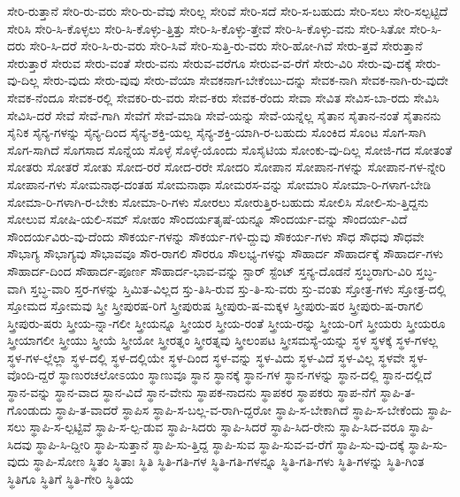 {ಸೇರಿ-ರುತ್ತಾನೆ
ಸೇರಿ-ರು-ವರು
ಸೇರಿ-ರು-ವೆವು
ಸೇರಿಲ್ಲ
ಸೇರಿವೆ
ಸೇರಿ-ಸದೆ
ಸೇರಿ-ಸ-ಬಹುದು
ಸೇರಿ-ಸಲು
ಸೇರಿ-ಸಲ್ಪಟ್ಟಿದೆ
ಸೇರಿಸಿ
ಸೇರಿ-ಸಿ-ಕೊಳ್ಳಲು
ಸೇರಿ-ಸಿ-ಕೊಳ್ಳು-ತ್ತಿತ್ತು
ಸೇರಿ-ಸಿ-ಕೊಳ್ಳು-ತ್ತೇವೆ
ಸೇರಿ-ಸಿ-ಕೊಳ್ಳು-ವನು
ಸೇರಿ-ಸಿತೋ
ಸೇರಿ-ಸಿ-ದರು
ಸೇರಿ-ಸಿ-ದರೆ
ಸೇರಿ-ಸಿ-ರು-ವರು
ಸೇರಿ-ಸಿವೆ
ಸೇರಿ-ಸುತ್ತಿ-ರು-ವರು
ಸೇರಿ-ಹೋ-ಗಿವೆ
ಸೇರು-ತ್ತವೆ
ಸೇರುತ್ತಾನೆ
ಸೇರುತ್ತಾರೆ
ಸೇರುವ
ಸೇರು-ವಂತೆ
ಸೇರು-ವನು
ಸೇರುವ-ವರೆಗೂ
ಸೇರುವ-ವ-ರೆಗೆ
ಸೇರು-ವಿರಿ
ಸೇರು-ವು-ದಕ್ಕೆ
ಸೇರು-ವು-ದಿಲ್ಲ
ಸೇರು-ವುದು
ಸೇರು-ವುವು
ಸೇರು-ವೆಯಾ
ಸೇವಕನಾಗ-ಬೇಕೆಂಬು-ದನ್ನು
ಸೇವಕ-ನಾಗಿ
ಸೇವಕ-ನಾಗಿ-ರು-ವುದೇ
ಸೇವಕ-ನೆಂದೂ
ಸೇವಕ-ರಲ್ಲಿ
ಸೇವಕರಿ-ರು-ವರು
ಸೇವ-ಕರು
ಸೇವಕ-ರೆಂದು
ಸೇವಾ
ಸೇವಿತ
ಸೇವಿಸ-ಬಾ-ರದು
ಸೇವಿಸಿ
ಸೇವಿಸಿ-ದರೆ
ಸೇವೆ
ಸೇವೆ-ಗಾಗಿ
ಸೇವೆಗೆ
ಸೇವೆ-ಮಾಡಿ
ಸೇವೆ-ಯನ್ನು
ಸೇವೆ-ಯನ್ನೆಲ್ಲ
ಸೈತಾನ
ಸೈತಾನ-ನಂತೆ
ಸೈತಾನನು
ಸೈನಿಕ
ಸೈನ್ಯ-ಗಳನ್ನು
ಸೈನ್ಯ-ದಿಂದ
ಸೈನ್ಯ-ಶಕ್ತಿ-ಯಲ್ಲ
ಸೈನ್ಯ-ಶಕ್ತಿ-ಯಾಗಿ-ರ-ಬಹುದು
ಸೊಂಕಿದ
ಸೊಂಟ
ಸೊಗ-ಸಾಗಿ
ಸೊಗ-ಸಾಗಿದೆ
ಸೊಗಸಾದ
ಸೊನ್ನೆಯ
ಸೊಳ್ಳೆ
ಸೊಳ್ಳೆ-ಯೊಂದು
ಸೊಸೈಟಿಯ
ಸೋಂಕು-ವು-ದಿಲ್ಲ
ಸೋಜಿ-ಗದ
ಸೋತಂತೆ
ಸೋತರು
ಸೋತರೆ
ಸೋತು
ಸೋದ-ರರೆ
ಸೋದ-ರರೇ
ಸೋದರಿ
ಸೋಪಾನ
ಸೋಪಾನ-ಗಳನ್ನು
ಸೋಪಾನ-ಗಳ-ನ್ನೇರಿ
ಸೋಪಾನ-ಗಳು
ಸೋಮನಾಥ-ದಂತಹ
ಸೋಮನಾಥಾ
ಸೋಮರಸ-ವನ್ನು
ಸೋಮಾರಿ
ಸೋಮಾ-ರಿ-ಗಳಾಗ-ಬೇಡಿ
ಸೋಮಾ-ರಿ-ಗಳಾಗಿ-ರ-ಬೇಕು
ಸೋಮಾ-ರಿ-ಗಳು
ಸೋರಲು
ಸೋರುತ್ತಿರ-ಬಹುದು
ಸೋಲಿಸಿ
ಸೋಲಿ-ಸು-ತ್ತಿದ್ದನು
ಸೋಲುವ
ಸೋಷಿ-ಯಲಿ-ಸಮ್
ಸೋಹಂ
ಸೌಂದರ್ಯತೃಷೆ-ಯನ್ನೂ
ಸೌಂದರ್ಯ-ವನ್ನು
ಸೌಂದರ್ಯ-ವಿದೆ
ಸೌಂದರ್ಯವಿರು-ವು-ದೆಂದು
ಸೌಕರ್ಯ-ಗಳನ್ನು
ಸೌಕರ್ಯ-ಗಳಿ-ದ್ದುವು
ಸೌಕರ್ಯ-ಗಳು
ಸೌಧ
ಸೌಧವು
ಸೌಧವೇ
ಸೌಭಾಗ್ಯ
ಸೌಭಾಗ್ಯವು
ಸೌಭಾವವೂ
ಸೌರ-ರಾಗಲಿ
ಸೌರರೂ
ಸೌಲಭ್ಯ-ಗಳನ್ನು
ಸೌಹಾರ್ದ
ಸೌಹಾರ್ದಕ್ಕೆ
ಸೌಹಾರ್ದ-ಗಳು
ಸೌಹಾರ್ದ-ದಿಂದ
ಸೌಹಾರ್ದ-ಪೂರ್ಣ
ಸೌಹಾರ್ದ-ಭಾವ-ವನ್ನು
ಸ್ಟಾರ್
ಸ್ಟೆಂಟ್
ಸ್ತನ್ಯ-ದೊಡನೆ
ಸ್ತಬ್ಧರಾಗು-ವಿರಿ
ಸ್ತಬ್ಧ-ವಾಗಿ
ಸ್ತಬ್ಧ-ವಾರಿ
ಸ್ತರ-ಗಳನ್ನು
ಸ್ತಿಮಿತ-ವಿಲ್ಲದ
ಸ್ತು-ತಿಸಿ-ರುವ
ಸ್ತು-ತಿ-ಸು-ವರು
ಸ್ತು-ವಂತು
ಸ್ತೋತ್ರ-ಗಳು
ಸ್ತೋತ್ರ-ದಲ್ಲಿ
ಸ್ತೋಮದ
ಸ್ತೋಮವು
ಸ್ತ್ರೀ
ಸ್ತ್ರೀಪುರಷ-ರಿಗೆ
ಸ್ತ್ರೀಪುರುಷ
ಸ್ತ್ರೀಪುರು-ಷ-ಮಕ್ಕಳ
ಸ್ತ್ರೀಪುರು-ಷರ
ಸ್ತ್ರೀಪುರು-ಷ-ರಾಗಲಿ
ಸ್ತ್ರೀಪುರು-ಷರು
ಸ್ತ್ರೀಯ-ನ್ನಾ-ಗಲೀ
ಸ್ತ್ರೀಯನ್ನೂ
ಸ್ತ್ರೀಯರ
ಸ್ತ್ರೀಯ-ರಂತೆ
ಸ್ತ್ರೀಯ-ರನ್ನು
ಸ್ತ್ರೀಯ-ರಿಗೆ
ಸ್ತ್ರೀಯರು
ಸ್ತ್ರೀಯರೂ
ಸ್ತ್ರೀಯಾಗಲೀ
ಸ್ತ್ರೀಯು
ಸ್ತ್ರೀಯೆ
ಸ್ತ್ರೀಯೋ
ಸ್ತ್ರೀರತ್ನಂ
ಸ್ತ್ರೀರತ್ನವು
ಸ್ತ್ರೀಲಂಪಟ
ಸ್ತ್ರೀಸಮಸ್ಯೆ-ಯನ್ನು
ಸ್ಥಳ
ಸ್ಥಳಕ್ಕೆ
ಸ್ಥಳ-ಗಳಲ್ಲ
ಸ್ಥಳ-ಗಳ-ಲ್ಲೆಲ್ಲಾ
ಸ್ಥಳ-ದಲ್ಲಿ
ಸ್ಥಳ-ದಲ್ಲಿಯೇ
ಸ್ಥಳ-ದಿಂದ
ಸ್ಥಳ-ವನ್ನು
ಸ್ಥಳ-ವಿದು
ಸ್ಥಳ-ವಿದೆ
ಸ್ಥಳ-ವಿಲ್ಲ
ಸ್ಥಳವೇ
ಸ್ಥಳ-ವೊಂದಿ-ದ್ದರೆ
ಸ್ಥಾಣುರಚಲೋಽಯಂ
ಸ್ಥಾಣುವೂ
ಸ್ಥಾನ
ಸ್ಥಾನಕ್ಕೆ
ಸ್ಥಾನ-ಗಳ
ಸ್ಥಾನ-ಗಳನ್ನು
ಸ್ಥಾನ-ದಲ್ಲಿ
ಸ್ಥಾನ-ದಲ್ಲಿದೆ
ಸ್ಥಾನ-ವನ್ನು
ಸ್ಥಾನ-ವಾದ
ಸ್ಥಾನ-ವಿದೆ
ಸ್ಥಾನ-ವೇನು
ಸ್ಥಾಪಕ-ನಾದನು
ಸ್ಥಾಪಕರ
ಸ್ಥಾಪಕರು
ಸ್ಥಾಪ-ನೆಗೆ
ಸ್ಥಾಪಿ-ತ-ಗೊಂಡುದು
ಸ್ಥಾಪಿ-ತ-ವಾದರೆ
ಸ್ಥಾಪಿಸ
ಸ್ಥಾಪಿ-ಸ-ಬಲ್ಲ-ವ-ರಾಗಿ-ದ್ದರೋ
ಸ್ಥಾಪಿ-ಸ-ಬೇಕಾಗಿದೆ
ಸ್ಥಾಪಿ-ಸ-ಬೇಕೆಂದು
ಸ್ಥಾಪಿ-ಸಲು
ಸ್ಥಾಪಿ-ಸ-ಲ್ಪಟ್ಟಿವೆ
ಸ್ಥಾಪಿ-ಸ-ಲ್ಪ-ಡುವ
ಸ್ಥಾಪಿ-ಸಿದರು
ಸ್ಥಾಪಿ-ಸಿದರೆ
ಸ್ಥಾಪಿ-ಸಿದ-ರೇನು
ಸ್ಥಾಪಿ-ಸಿದ-ವರೂ
ಸ್ಥಾಪಿ-ಸಿದವು
ಸ್ಥಾಪಿ-ಸಿ-ದ್ದೀರಿ
ಸ್ಥಾಪಿ-ಸುತ್ತಾನೆ
ಸ್ಥಾಪಿ-ಸು-ತ್ತಿದ್ದ
ಸ್ಥಾಪಿ-ಸುವ
ಸ್ಥಾಪಿ-ಸುವ-ವ-ರೆಗೆ
ಸ್ಥಾಪಿ-ಸು-ವು-ದಕ್ಕೆ
ಸ್ಥಾಪಿ-ಸು-ವುದು
ಸ್ಥಾಪಿ-ಸೋಣ
ಸ್ಥಿತಂ
ಸ್ಥಿತಾಃ
ಸ್ಥಿತಿ
ಸ್ಥಿತಿ-ಗತಿ-ಗಳ
ಸ್ಥಿತಿ-ಗತಿ-ಗಳನ್ನೂ
ಸ್ಥಿತಿ-ಗತಿ-ಗಳು
ಸ್ಥಿತಿ-ಗಳನ್ನು
ಸ್ಥಿತಿ-ಗಿಂತ
ಸ್ಥಿತಿಗೂ
ಸ್ಥಿತಿಗೆ
ಸ್ಥಿತಿ-ಗೇರಿ
ಸ್ಥಿತಿಯ
}
